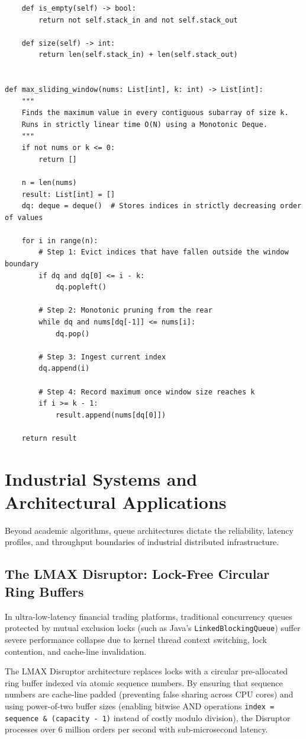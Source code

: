 \documentclass[10pt,journal,compsoc,onecolumn]{IEEEtran}
\begin{document}
\begin{verbatim}
    def is_empty(self) -> bool:
        return not self.stack_in and not self.stack_out

    def size(self) -> int:
        return len(self.stack_in) + len(self.stack_out)


def max_sliding_window(nums: List[int], k: int) -> List[int]:
    """
    Finds the maximum value in every contiguous subarray of size k.
    Runs in strictly linear time O(N) using a Monotonic Deque.
    """
    if not nums or k <= 0:
        return []

    n = len(nums)
    result: List[int] = []
    dq: deque = deque()  # Stores indices in strictly decreasing order of values

    for i in range(n):
        # Step 1: Evict indices that have fallen outside the window boundary
        if dq and dq[0] <= i - k:
            dq.popleft()

        # Step 2: Monotonic pruning from the rear
        while dq and nums[dq[-1]] <= nums[i]:
            dq.pop()

        # Step 3: Ingest current index
        dq.append(i)

        # Step 4: Record maximum once window size reaches k
        if i >= k - 1:
            result.append(nums[dq[0]])

    return result
\end{verbatim}

\section{Industrial Systems and Architectural Applications}
\label{sec:systems_applications}

Beyond academic algorithms, queue architectures dictate the reliability, latency profiles, and throughput boundaries of industrial distributed infrastructure.

\subsection{The LMAX Disruptor: Lock-Free Circular Ring Buffers}
In ultra-low-latency financial trading platforms, traditional concurrency queues protected by mutual exclusion locks (such as Java's \texttt{LinkedBlockingQueue}) suffer severe performance collapse due to kernel thread context switching, lock contention, and cache-line invalidation.

The LMAX Disruptor architecture replaces locks with a circular pre-allocated ring buffer indexed via atomic sequence numbers. By ensuring that sequence numbers are cache-line padded (preventing false sharing across CPU cores) and using power-of-two buffer sizes (enabling bitwise AND operations \texttt{index = sequence \& (capacity - 1)} instead of costly modulo division), the Disruptor processes over 6 million orders per second with sub-microsecond latency.
\end{document}
